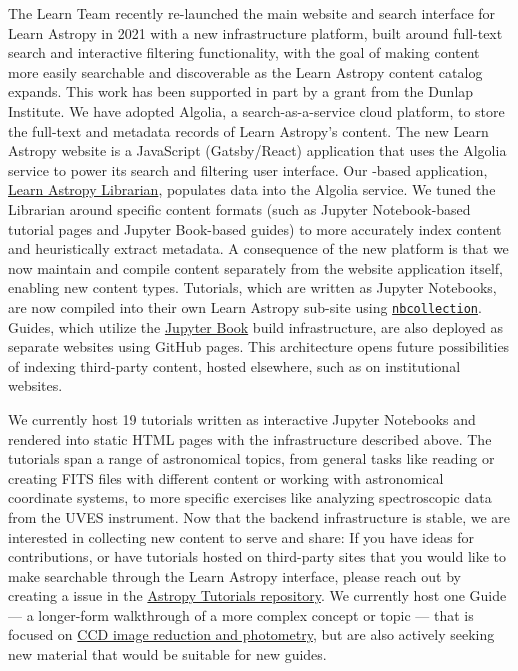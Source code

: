 \documentclass[modern]{aastex631}
\begin{document}
The Learn Team recently re-launched the main website and search interface for
Learn Astropy in 2021 with a new infrastructure platform, built around full-text
search and interactive filtering functionality, with the goal of making content
more easily searchable and discoverable as the Learn Astropy content catalog
expands.
This work has been supported in part by a grant from the Dunlap Institute.
We have adopted Algolia, a search-as-a-service cloud platform, to store the
full-text and metadata records of Learn Astropy's content.
The new Learn Astropy website is a JavaScript (Gatsby/React) application that
uses the Algolia service to power its search and filtering user interface.
Our \python-based application,
\href{https://github.com/astropy/learn-astropy-librarian/}{Learn Astropy
Librarian}, populates data into the Algolia service. We tuned the Librarian
around specific content formats (such as Jupyter Notebook-based tutorial pages
and Jupyter Book-based guides) to more accurately index content and
heuristically extract metadata.
A consequence of the new platform is that we now maintain and compile content
separately from the website application itself, enabling new content types.
Tutorials, which are written as Jupyter Notebooks, are now compiled into their
own Learn Astropy sub-site using
\href{https://github.com/astropy/nbcollection}{\texttt{nbcollection}}.
Guides, which utilize the \href{https://jupyterbook.org/}{Jupyter Book} build
infrastructure, are also deployed as separate websites using GitHub pages.
This architecture opens future possibilities of indexing third-party content,
hosted elsewhere, such as on institutional websites.

We currently host 19 tutorials written as interactive Jupyter Notebooks and
rendered into static HTML pages with the infrastructure described above.
The tutorials span a range of astronomical topics, from general tasks like
reading or creating FITS files with different content or working with
astronomical coordinate systems, to more specific exercises like analyzing
spectroscopic data from the UVES instrument.
Now that the backend infrastructure is stable, we are interested in collecting
new content to serve and share: If you have ideas for contributions, or have
tutorials hosted on third-party sites that you would like to make searchable
through the Learn Astropy interface, please reach out by creating a \github
issue in the \href{https://github.com/astropy/astropy-tutorials}{Astropy
Tutorials repository}.
We currently host one Guide --- a longer-form walkthrough of a more complex
concept or topic --- that is focused on
\href{http://www.astropy.org/ccd-reduction-and-photometry-guide}{CCD image
reduction and photometry}, but are also actively seeking new material that would
be suitable for new guides.
\end{document}
